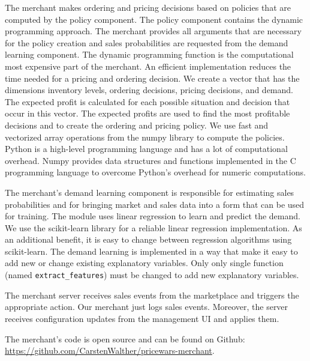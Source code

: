 The merchant makes ordering and pricing decisions based on policies that are computed by the policy component.
The policy component contains the dynamic programming approach.
The merchant provides all arguments that are necessary for the policy creation and sales probabilities are requested from the demand learning component.
The dynamic programming function is the computational most expensive part of the merchant.
An efficient implementation reduces the time needed for a pricing and ordering decision.
We create a vector that has the dimensions inventory levels, ordering decisions, pricing decisions, and demand.
The expected profit is calculated for each possible situation and decision that occur in this vector.
The expected profits are used to find the most profitable decisions and to create the ordering and pricing policy.
We use fast and vectorized array operations from the numpy library to compute the policies.
Python is a high-level programming language and has a lot of computational overhead.
Numpy provides data structures and functions implemented in the C programming language to overcome Python's overhead for numeric computations.

The merchant's demand learning component is responsible for estimating sales probabilities and for bringing market and sales data into a form that can be used for training.
The module uses linear regression to learn and predict the demand.
We use the scikit-learn library for a reliable linear regression implementation.
As an additional benefit, it is easy to change between regression algorithms using scikit-learn.
The demand learning is implemented in a way that make it easy to add new or change existing explanatory variables.
Only only single function (named \texttt{extract\_features}) must be changed to add new explanatory variables.

The merchant server receives sales events from the marketplace and triggers the appropriate action.
Our merchant just logs sales events.
Moreover, the server receives configuration updates from the management UI and applies them.  

The merchant's code is open source and can be found on Github: \url{https://github.com/CarstenWalther/pricewars-merchant}.

